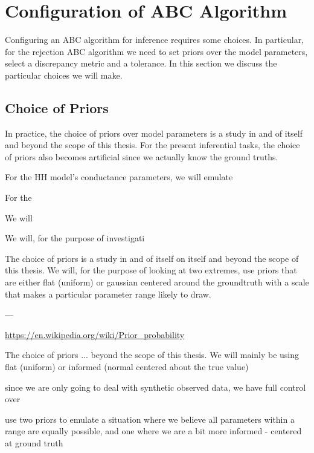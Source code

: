 \section{Configuration of ABC Algorithm}

Configuring an ABC algorithm for inference requires some choices. In particular, for the rejection ABC algorithm we need to set priors over the model parameters, select a discrepancy metric and a tolerance. In this section we discuss the particular choices we will make. 

\subsection{Choice of Priors}

In practice, the choice of priors over model parameters is a study in and of itself and beyond the scope of this thesis. For the present inferential tasks, the choice of priors also becomes artificial since we actually know the ground truths. 

For the HH model's conductance parameters, we will emulate 

For the 

We will 

We will, for the purpose of investigati

The choice of priors is a study in and of itself on itself and beyond the scope of this thesis. We will, for the purpose of looking at two extremes, use priors that are either flat (uniform) or gaussian centered around the groundtruth with a scale that makes a particular parameter range likely to draw.

---

\url{https://en.wikipedia.org/wiki/Prior_probability}


The choice of priors ... beyond the scope of this thesis. We will mainly be using flat (uniform) or informed (normal centered about the true value)

since we are only going to deal with synthetic observed data, we have full control over 

use two priors to emulate a situation where we believe all parameters within a range are equally possible, and one where we are a bit more informed - centered at ground truth

